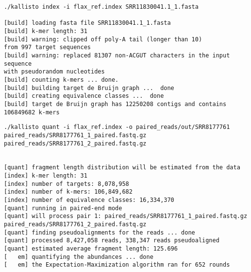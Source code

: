 \begin{verbatim}
./kallisto index -i flax_ref.index SRR11830041.1_1.fasta

[build] loading fasta file SRR11830041.1_1.fasta
[build] k-mer length: 31
[build] warning: clipped off poly-A tail (longer than 10)
from 997 target sequences
[build] warning: replaced 81307 non-ACGUT characters in the input sequence
with pseudorandom nucleotides
[build] counting k-mers ... done.
[build] building target de Bruijn graph ...  done
[build] creating equivalence classes ...  done
[build] target de Bruijn graph has 12250208 contigs and contains 106849682 k-mers

\end{verbatim}

\begin{verbatim}
./kallisto quant -i flax_ref.index -o paired_reads/out/SRR8177761 paired_reads/SRR8177761_1_paired.fastq.gz  paired_reads/SRR8177761_2_paired.fastq.gz


[quant] fragment length distribution will be estimated from the data
[index] k-mer length: 31
[index] number of targets: 8,078,958
[index] number of k-mers: 106,849,682
[index] number of equivalence classes: 16,334,370
[quant] running in paired-end mode
[quant] will process pair 1: paired_reads/SRR8177761_1_paired.fastq.gz
paired_reads/SRR8177761_2_paired.fastq.gz
[quant] finding pseudoalignments for the reads ... done
[quant] processed 8,427,058 reads, 338,347 reads pseudoaligned
[quant] estimated average fragment length: 125.696
[   em] quantifying the abundances ... done
[   em] the Expectation-Maximization algorithm ran for 652 rounds
\end{verbatim}
